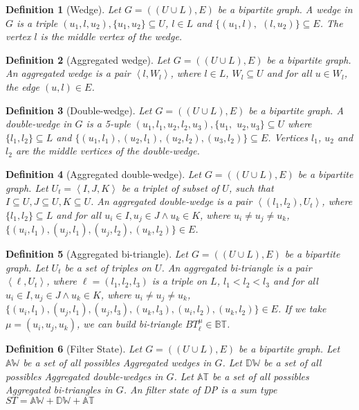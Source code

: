 \documentclass[12pt, a4paper]{article}
\newcommand{\dw}{\mathbb{DW}}
\newcommand{\aw}{\mathbb{AW}}
\newcommand{\bt}{\mathbb{BT}}
\newcommand{\at}{\mathbb{AT}}
\newcommand{\st}{ST}
\newcommand{\la}{\left\langle}
\newcommand{\ra}{\right\rangle}
\newtheorem{definition}{Definition}
\begin{document}
\begin{definition}[Wedge]
Let $G=((U\cup L),E)$ be a bipartite graph. A  \textit{wedge} in $G$ is a triple $(u_1,l,u_2), \{u_1,u_2\}\subseteq U$, $l \in L$ and $\{(u_1,l),$ $(l,u_2)\} \subseteq E$. The vertex $l$ is the middle vertex of the wedge. 
\end{definition}
%   
\begin{definition}[Aggregated wedge]
Let $G=((U\cup L),E)$ be a bipartite graph. An  \textit{aggregated wedge} is a pair $\la l, W_l \ra$, where $l \in L$, $W_l \subseteq U$ and for all $u\in W_l$, the edge  $(u,l)\in E$. 
\end{definition}
%
\begin{definition}[Double-wedge]
Let $G=((U\cup L),E)$ be a bipartite graph. A \textit{double-wedge} in $G$ is a 5-uple $(u_1,l_1,u_2,l_2,u_3), \{u_1,$ $u_2,u_3\}\subseteq U$ where $\{l_1,l_2\}\subseteq L$ and $\{(u_1,l_1), (u_2,l_1), (u_2, l_2), (u_3,l_2)\} \subseteq E$. Vertices $l_1$, $u_2$ and $l_2$ are the middle vertices of the double-wedge. 
\end{definition}
%  
\begin{definition}[Aggregated double-wedge]
Let $G=((U\cup L),E)$ be a bipartite graph. Let $U_t = \la I, J, K\ra$ be a triplet of subset of $U$, such that $I \subseteq U, J \subseteq U, K \subseteq U$.  An \textit{aggregated double-wedge}  is a pair  $\la (l_1, l_2), U_t \ra$, where $\{l_1,l_2\}\subseteq L$ and  for all $u_i \in I, u_j \in J \land u_k \in K$, where $u_i \neq u_j \neq u_k$, 
$\{(u_i, l_1), (u_j, l_1), (u_j, l_2), (u_k, l_2)\} \in E$.
\end{definition}
%
\begin{definition}[Aggregated bi-triangle]
Let $G=((U\cup L),E)$ be a bipartite graph. Let $U_t$ be a set of triples on $U$. An \textit{aggregated bi-triangle}  is a pair  $\la \ell, U_t \ra$, where $\ell=(l_1, l_2, l_3)$ is a triple on $L$, $l_1 < l_2 < l_3$ and for all $u_i \in I, u_j \in J \land u_k \in K$, where $u_i \neq u_j \neq u_k$,
\\$\{(u_i, l_1), (u_j, l_1), (u_j, l_3), (u_k, l_3), (u_i, l_2), (u_k, l_2)\} \in E$. If we take $\mu=(u_i, u_j, u_k)$, we can build bi-triangle $BT_{\ell}^{\mu}\in \bt$.
\end{definition}
%
\begin{definition}[Filter State]
Let $G=((U\cup L),E)$ be a bipartite graph. 
Let $\aw$ be a set of all possibles Aggregated wedges in $G$.
Let $\dw$ be a set of all possibles Aggregated double-wedges in $G$.
Let $\at$ be a set of all possibles Aggregated bi-triangles in $G$.
An \textit{filter state} of DP is a sum type $\st = \aw + \dw + \at$
\end{definition}
\end{document}
